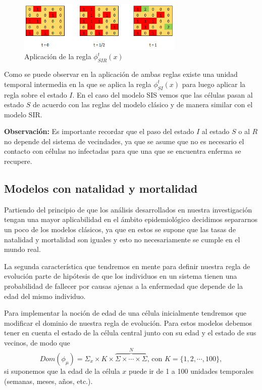 \begin{figure}[h]
  \centering
    \includegraphics[width=0.7\textwidth]{Imagenes/sirAplication.PNG}
    \caption{Aplicación de la regla $\phi_{SIR}^t(x)$}
\end{figure}

Como se puede observar en la aplicación de ambas reglas existe una unidad temporal intermedia en la que se aplica la regla $\phi_{SI}^t(x)$ para luego aplicar la regla sobre el estado $I$. En el caso del modelo SIS vemos que las células pasan al estado $S$ de acuerdo con las reglas del modelo clásico y de manera similar con el modelo SIR.

\textbf{Observación:} Es importante recordar que el paso del estado $I$ al estado $S$ o al $R$ no depende del sistema de vecindades, ya que se asume que no es necesario el contacto con células no infectadas para que una que se encuentra enferma se recupere.

\subsection{Modelos con natalidad y mortalidad}
Partiendo del principio de que los análisis desarrollados en nuestra investigación tengan una mayor aplicabilidad en el ámbito epidemiológico decidimos separarnos un poco de los modelos clásicos, ya que en estos se supone que las tasas de natalidad y mortalidad son iguales y esto no necesariamente se cumple en el mundo real.

La segunda característica que tendremos en mente para definir nuestra regla de evolución parte de hipótesis de que los individuos en un sistema tienen una probabilidad de fallecer por causas ajenas a la enfermedad que depende de la edad del mismo individuo.

Para implementar la noción de edad de una célula inicialmente tendremos que modificar el dominio de nuestra regla de evolución. Para estos modelos debemos tener en cuenta el estado de la célula central junto con su edad y el estado de sus vecinos, de modo que 
$$Dom(\phi_\mu)=\Sigma_x\times K\times\overbrace{\Sigma\times\cdots\times\Sigma}^N\text{, con }K=\{1,2,\cdots,100\},$$
si suponemos que la edad de la célula $x$ puede ir de 1 a 100 unidades temporales (semanas, meses, años, etc.).

